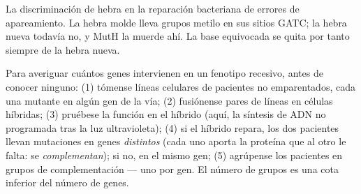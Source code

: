 \begin{omfigure}

{\small La discriminación de hebra en la reparación bacteriana de errores
de apareamiento. La hebra molde lleva grupos metilo en sus sitios GATC;
la hebra nueva todavía no, y MutH la muerde ahí. La base equivocada se
quita por tanto siempre de la hebra nueva.}
\end{omfigure}

\begin{method}\label{met:b3:dna-repair:complementation}
Para averiguar cuántos genes intervienen en un fenotipo recesivo, antes
de conocer ninguno: (1) tómense líneas celulares de pacientes no
emparentados, cada una mutante en algún gen de la vía; (2) fusiónense
pares de líneas en células híbridas; (3) pruébese la función en el
híbrido (aquí, la síntesis de ADN no programada tras la luz
ultravioleta); (4) si el híbrido repara, los dos pacientes llevan
mutaciones en genes \emph{distintos} (cada uno aporta la proteína que al
otro le falta: se \emph{complementan}); si no, en el mismo gen; (5)
agrúpense los pacientes en grupos de complementación --- uno por gen. El
número de grupos es una cota inferior del número de genes.
\end{method}

